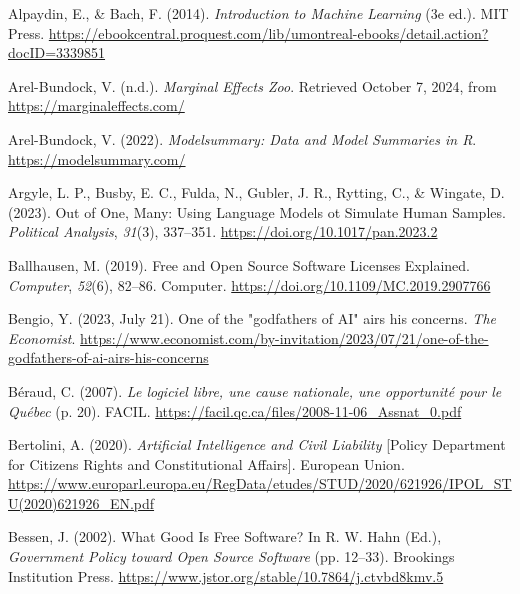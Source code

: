 \documentclass[
  letterpaper,
  DIV=11,
  numbers=noendperiod]{scrreprt}
\newlength{\cslhangindent}
\newlength{\cslentryspacingunit} %
\newenvironment{CSLReferences}[2] %
 {%
  \setlength{\parindent}{0pt}
  \ifodd #1
  \let\oldpar\par
  \def\par{\hangindent=\cslhangindent\oldpar}
  \fi
  \setlength{\parskip}{#2\cslentryspacingunit}
 }%
 {}
\begin{document}

\hypertarget{refs}{}
\begin{CSLReferences}{1}{0}
\leavevmode{}%
Alpaydin, E., \& Bach, F. (2014). \emph{Introduction to {Machine
Learning}} (3e ed.). MIT Press.
\url{https://ebookcentral.proquest.com/lib/umontreal-ebooks/detail.action?docID=3339851}

\leavevmode{}%
Arel-Bundock, V. (n.d.). \emph{Marginal {Effects Zoo}}. Retrieved
October 7, 2024, from \url{https://marginaleffects.com/}

\leavevmode{}%
Arel-Bundock, V. (2022). \emph{Modelsummary: {Data} and {Model
Summaries} in {R}}. \url{https://modelsummary.com/}

\leavevmode{}%
Argyle, L. P., Busby, E. C., Fulda, N., Gubler, J. R., Rytting, C., \&
Wingate, D. (2023). Out of {One}, {Many}: {Using Language Models} ot
{Simulate Human Samples}. \emph{Political Analysis}, \emph{31}(3),
337--351. \url{https://doi.org/10.1017/pan.2023.2}

\leavevmode{}%
Ballhausen, M. (2019). Free and {Open Source Software Licenses
Explained}. \emph{Computer}, \emph{52}(6), 82--86. Computer.
\url{https://doi.org/10.1109/MC.2019.2907766}

\leavevmode{}%
Bengio, Y. (2023, July 21). One of the "godfathers of {AI}" airs his
concerns. \emph{The Economist}.
\url{https://www.economist.com/by-invitation/2023/07/21/one-of-the-godfathers-of-ai-airs-his-concerns}

\leavevmode{}%
Béraud, C. (2007). \emph{Le logiciel libre, une cause nationale, une
opportunité pour le {Québec}} (p. 20). FACIL.
\url{https://facil.qc.ca/files/2008-11-06_Assnat_0.pdf}

\leavevmode{}%
Bertolini, A. (2020). \emph{Artificial {Intelligence} and {Civil
Liability}} {[}Policy Department for Citizen\textquotesingle s Rights
and Constitutional Affairs{]}. European Union.
\url{https://www.europarl.europa.eu/RegData/etudes/STUD/2020/621926/IPOL_STU(2020)621926_EN.pdf}

\leavevmode{}%
Bessen, J. (2002). What {Good Is Free Software}? In R. W. Hahn (Ed.),
\emph{Government {Policy} toward {Open Source Software}} (pp. 12--33).
Brookings Institution Press.
\url{https://www.jstor.org/stable/10.7864/j.ctvbd8kmv.5}


\end{CSLReferences}
\end{document}

